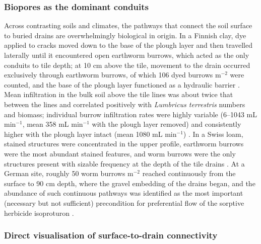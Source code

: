 \subsubsection{Biopores as the dominant conduits}

Across contrasting soils and climates, the pathways that connect the soil surface to
buried drains are overwhelmingly biological in origin. In a Finnish clay, dye applied
to cracks moved down to the base of the plough layer and then travelled laterally
until it encountered open earthworm burrows, which acted as the only conduits to tile
depth; at 10 cm above the tile, movement to the drain occurred exclusively through
earthworm burrows, of which 106 dyed burrows m$^{-2}$ were counted, and the base of
the plough layer functioned as a hydraulic barrier \parencite{Shipitalo2004}. Mean
infiltration in the bulk soil above the tile lines was about twice that between the
lines and correlated positively with \textit{Lumbricus terrestris} numbers and
biomass; individual burrow infiltration rates were highly variable (6--1043 mL
min$^{-1}$, mean 358 mL min$^{-1}$ with the plough layer removed) and consistently
higher with the plough layer intact (mean 1080 mL min$^{-1}$)
\parencite{Shipitalo2004}. In a Swiss loam, stained structures were concentrated in
the upper profile, earthworm burrows were the most abundant stained features, and
worm burrows were the only structures present with sizable frequency at the depth of
the tile drains \parencite{Stamm2002}. At a German site, roughly 50 worm burrows
m$^{-2}$ reached continuously from the surface to 90 cm depth, where the gravel
embedding of the drains began, and the abundance of such continuous pathways was
identified as the most important (necessary but not sufficient) precondition for
preferential flow of the sorptive herbicide isoproturon \parencite{Zehe2001}.

\subsubsection{Direct visualisation of surface-to-drain connectivity}

